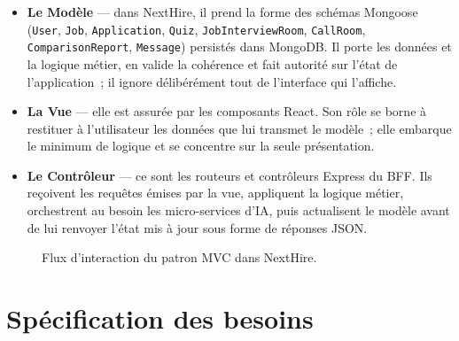\begin{itemize}
  \item \textbf{Le Modèle} — dans NextHire, il prend la forme des schémas Mongoose (\texttt{User}, \texttt{Job}, \texttt{Application}, \texttt{Quiz}, \texttt{JobInterviewRoom}, \texttt{CallRoom}, \texttt{ComparisonReport}, \texttt{Message}) persistés dans MongoDB. Il porte les données et la logique métier, en valide la cohérence et fait autorité sur l’état de l’application~; il ignore délibérément tout de l’interface qui l’affiche.
  \item \textbf{La Vue} — elle est assurée par les composants React. Son rôle se borne à restituer à l’utilisateur les données que lui transmet le modèle~; elle embarque le minimum de logique et se concentre sur la seule présentation.
  \item \textbf{Le Contrôleur} — ce sont les routeurs et contrôleurs Express du BFF. Ils reçoivent les requêtes émises par la vue, appliquent la logique métier, orchestrent au besoin les micro-services d’IA, puis actualisent le modèle avant de lui renvoyer l’état mis à jour sous forme de réponses JSON.
\end{itemize}

\begin{figure}[H]
  \centering
  \caption{Flux d'interaction du patron MVC dans NextHire.}
  \label{fig:mvc}
\end{figure}

\section{Spécification des besoins}

